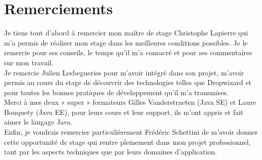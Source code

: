 \chapter*{Remerciements}


Je tiens tout d’abord à remercier mon maître de stage Christophe Lapierre qui m’a permis de réaliser mon stage dans les meilleures conditions possibles. 
Je le remercie pour ses conseils, le temps qu’il m’a consacré et pour ses commentaires sur mon travail. \\

Je remercie Julien Lesbegueries pour m'avoir intégré dans son projet, m'avoir permis au cours du stage de découvrir des technologies telles que Dropwizard et pour toutes les bonnes pratiques de développement qu'il m'a transmises.\\

Merci à mes deux « super » formateurs Gilles Vanderstraeten (Java SE) et Laure Bouquety (Java EE), pour leurs cours et leur support, ils m'ont appris et fait aimer le langage Java. \\

Enfin, je voudrais remercier particulièrement Frédéric Schettini de m’avoir donner cette opportunité de stage qui rentre pleinement dans mon projet professionnel, tant par les aspects techniques que par leurs domaines d'application. \\
